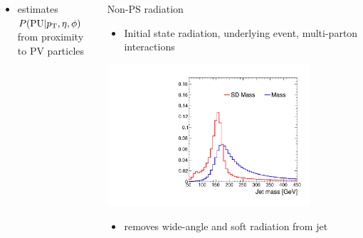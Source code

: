 \documentclass[aspectratio=169,xcolor=dvipsnames,,table,compress]{beamer}
\begin{document}
\begin{frame}[t]
\begin{columns}[T]
\begin{column}{0.33\textwidth}
      \vspace{-5mm}
  \begin{itemize}
    \item {\small {} estimates $P(\mathrm{PU}|p_\text{T},\eta,\phi)$ from proximity to PV particles}
  \end{itemize}
  \end{column}
  \pause 
  \begin{column}{0.33\textwidth}
    \centering 
    Non-PS radiation 
    \begin{itemize}
      \item {\small Initial state radiation, underlying event, multi-parton interactions}
    \end{itemize}
      \includegraphics[width=0.8\textwidth]{../figures/toptagging/gen/compare_ZpTT_lo.pdf}
      \vspace{-3mm}
    \begin{itemize}
      \item {\small {} removes wide-angle and soft radiation from jet}
    \end{itemize}
  \end{column}
  \end{columns}
\end{frame}
\end{document}
